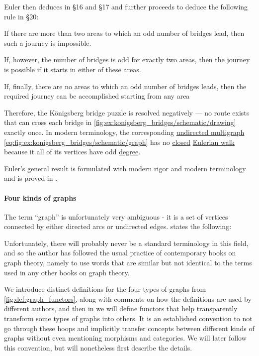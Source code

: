 \begin{example}
  Euler then deduces  in \S 16 and \S 17 and further proceeds to deduce the following rule in \S 20:
  \begin{displayquote}
    If there are more than two areas to which an odd number of bridges lead, then such a journey is impossible.

    If, however, the number of bridges is odd for exactly two areas, then the journey is possible if it starts in either of these areas.

    If, finally, there are no areas to which an odd number of bridges leads, then the required journey can be accomplished starting from any area
  \end{displayquote}

  Therefore, the K\"onigsberg bridge puzzle is resolved negatively --- no route exists that can cross each bridge in \cref{fig:ex:konigsberg_bridges/schematic/drawing} exactly once. In modern terminology, the corresponding \hyperref[def:undirected_multigraph]{undirected multigraph} \eqref{eq:fig:ex:konigsberg_bridges/schematic/graph} has no \hyperref[def:walk/closed]{closed} \hyperref[def:eulerian_walk]{Eulerian walk} because it all of its vertices have odd \hyperref[def:graph_cardinality/undirected_degree]{degree}.

  Euler's general result is formulated with modern rigor and modern terminology and is proved in .
\end{example}

\paragraph{Four kinds of graphs}\hfill

The term \enquote{graph} is unfortunately very ambiguous - it is a set of vertices connected by either directed arcs or undirected edges.  states the following:
\begin{displayquote}
  Unfortunately, there will probably never be a standard terminology in this field, and so the author has followed the usual practice of contemporary books on graph theory, namely to use words that are similar but not identical to the terms used in any other books on graph theory.
\end{displayquote}

 We introduce distinct definitions for the four types of graphs from \cref{fig:def:graph_functors}, along with comments on how the definitions are used by different authors, and then in  we will define functors that help transparently transform some types of graphs into others. It is an established convention to not go through these hoops and implicitly transfer concepts between different kinds of graphs without even mentioning morphisms and categories. We will later follow this convention, but will nonetheless first describe the details.

